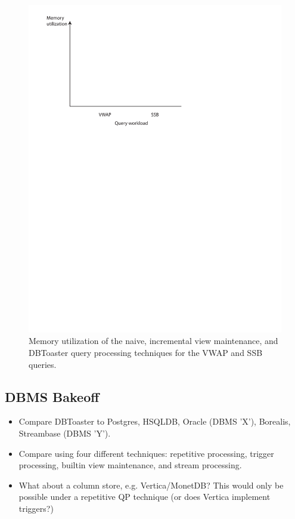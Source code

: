 \documentclass{sig-alternate}
\begin{document}
\begin{figure}
\includegraphics[scale=0.6]{figures/axes-memvsquery.pdf}
\caption{Memory utilization of the naive, incremental view maintenance, and
DBToaster query processing techniques for the VWAP and SSB queries.}
\label{fig:memutil-vsquery}
\end{figure}

\subsection{DBMS Bakeoff}
\begin{itemize}
\item Compare DBToaster to Postgres, HSQLDB, Oracle (DBMS 'X'), Borealis,
  Streambase (DBMS 'Y').
\item Compare using four different techniques: repetitive processing, trigger
  processing, builtin view maintenance, and stream processing.
\item What about a column store, e.g. Vertica/MonetDB? This would only be
  possible under a repetitive QP technique (or does Vertica implement triggers?)
\end{itemize}
\end{document}
